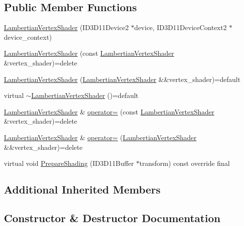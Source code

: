 \subsection*{Public Member Functions}
\begin{DoxyCompactItemize}
\item 
\hyperlink{classmage_1_1_lambertian_vertex_shader_a07be678df09024a53b3f5fc323a7f793}{Lambertian\+Vertex\+Shader} (I\+D3\+D11\+Device2 $\ast$device, I\+D3\+D11\+Device\+Context2 $\ast$device\+\_\+context)
\item 
\hyperlink{classmage_1_1_lambertian_vertex_shader_add164d66906e307d95232b2c41567a21}{Lambertian\+Vertex\+Shader} (const \hyperlink{classmage_1_1_lambertian_vertex_shader}{Lambertian\+Vertex\+Shader} \&vertex\+\_\+shader)=delete
\item 
\hyperlink{classmage_1_1_lambertian_vertex_shader_afd8f8b77d0e54df2241fe5f3f54205f4}{Lambertian\+Vertex\+Shader} (\hyperlink{classmage_1_1_lambertian_vertex_shader}{Lambertian\+Vertex\+Shader} \&\&vertex\+\_\+shader)=default
\item 
virtual \hyperlink{classmage_1_1_lambertian_vertex_shader_a55636fd3817b97b6529690d6e3e5cd46}{$\sim$\+Lambertian\+Vertex\+Shader} ()=default
\item 
\hyperlink{classmage_1_1_lambertian_vertex_shader}{Lambertian\+Vertex\+Shader} \& \hyperlink{classmage_1_1_lambertian_vertex_shader_a974b43346ab5d8081d9101f715e7670d}{operator=} (const \hyperlink{classmage_1_1_lambertian_vertex_shader}{Lambertian\+Vertex\+Shader} \&vertex\+\_\+shader)=delete
\item 
\hyperlink{classmage_1_1_lambertian_vertex_shader}{Lambertian\+Vertex\+Shader} \& \hyperlink{classmage_1_1_lambertian_vertex_shader_ae0a53e712856923403c1f7542941df6e}{operator=} (\hyperlink{classmage_1_1_lambertian_vertex_shader}{Lambertian\+Vertex\+Shader} \&\&vertex\+\_\+shader)=delete
\item 
virtual void \hyperlink{classmage_1_1_lambertian_vertex_shader_a51c0fcfc36cdf87e4e55c94529c0081a}{Prepare\+Shading} (I\+D3\+D11\+Buffer $\ast$transform) const override final
\end{DoxyCompactItemize}
\subsection*{Additional Inherited Members}


\subsection{Constructor \& Destructor Documentation}
\hypertarget{classmage_1_1_lambertian_vertex_shader_a07be678df09024a53b3f5fc323a7f793}{}\label{classmage_1_1_lambertian_vertex_shader_a07be678df09024a53b3f5fc323a7f793} 
